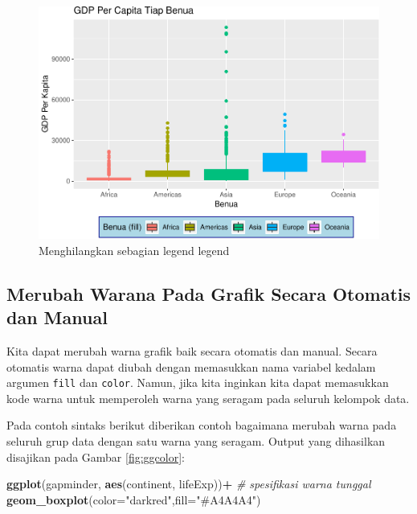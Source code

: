 \documentclass[]{book}
\newenvironment{Shaded}{\begin{snugshade}}{\end{snugshade}}
\newcommand{\KeywordTok}[1]{\textcolor[rgb]{0.13,0.29,0.53}{\textbf{#1}}}
\newcommand{\DataTypeTok}[1]{\textcolor[rgb]{0.13,0.29,0.53}{#1}}
\newcommand{\StringTok}[1]{\textcolor[rgb]{0.31,0.60,0.02}{#1}}
\newcommand{\CommentTok}[1]{\textcolor[rgb]{0.56,0.35,0.01}{\textit{#1}}}
\newcommand{\OperatorTok}[1]{\textcolor[rgb]{0.81,0.36,0.00}{\textbf{#1}}}
\newcommand{\NormalTok}[1]{#1}
\begin{document}
\begin{figure}

{\centering \includegraphics[width=0.7\linewidth]{EnvStat_files/figure-latex/gglegend5-1} 

}

\caption{Menghilangkan sebagian legend legend}\label{fig:gglegend5}
\end{figure}

\subsection{Merubah Warana Pada Grafik Secara Otomatis dan
Manual}\label{merubah-warana-pada-grafik-secara-otomatis-dan-manual}

Kita dapat merubah warna grafik baik secara otomatis dan manual. Secara
otomatis warna dapat diubah dengan memasukkan nama variabel kedalam
argumen \texttt{fill} dan \texttt{color}. Namun, jika kita inginkan kita
dapat memasukkan kode warna untuk memperoleh warna yang seragam pada
seluruh kelompok data.

Pada contoh sintaks berikut diberikan contoh bagaimana merubah warna
pada seluruh grup data dengan satu warna yang seragam. Output yang
dihasilkan disajikan pada Gambar \ref{fig:ggcolor}:

\begin{Shaded}
\begin{Highlighting}[]
\KeywordTok{ggplot}\NormalTok{(gapminder, }\KeywordTok{aes}\NormalTok{(continent, lifeExp))}\OperatorTok{+}
\StringTok{  }\CommentTok{# spesifikasi warna tunggal}
\StringTok{  }\KeywordTok{geom_boxplot}\NormalTok{(}\DataTypeTok{color=}\StringTok{"darkred"}\NormalTok{,}\DataTypeTok{fill=}\StringTok{"#A4A4A4"}\NormalTok{)}
\end{Highlighting}
\end{Shaded}
\end{document}
